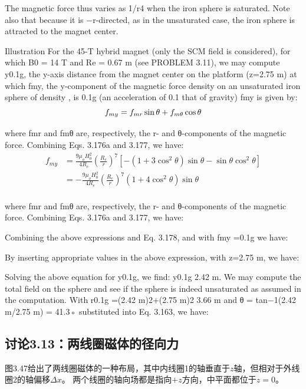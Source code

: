 The magnetic force thus varies as 1/r4 when the iron sphere is saturated. Note
also that because it is −r-directed, as in the unsaturated case, the iron sphere is
attracted to the magnet center.

Illustration For the 45-T hybrid magnet (only the SCM field is considered), for
which B0 = 14 T and Re = 0.67 m (see PROBLEM 3.11), we may compute y0.1g,
the y-axis distance from the magnet center on the platform (z=2.75 m) at which
fmy, the y-component of the magnetic force density on an unsaturated iron sphere
of density , is 0.1g (an acceleration of 0.1 that of gravity) fmy is given by:
\begin{equation}
f_{my}=f_{mr}\sin\theta+f_{m\theta}\cos\theta\\%
\end{equation}

where fmr and fmθ are, respectively, the r- and θ-components of the magnetic
force. Combining Eqs. 3.176a and 3.177, we have:
\begin{equation}
\begin{split}
f_{my}&=\frac{9\mu_{o}H_{0}^{2}}{4R_{e}}(\frac{R_{e}}{r})^{7}[-(1+3\cos^{2}\theta)\sin\theta-\sin\theta\cos^{2}\theta]\\
&=-\frac{9\mu_{o}H_{0}^{2}}{4R_{e}}(\frac{R_{e}}{r})^{7}(1+4\cos^{2}\theta)\sin\theta\\%
\end{split}
\end{equation}

where fmr and fmθ are, respectively, the r- and θ-components of the magnetic
force. Combining Eqs. 3.176a and 3.177, we have:

Combining the above expressions and Eq. 3.178, and with fmy =0.1g we have:

By inserting appropriate values in the above expression, with z=2.75 m, we have:

Solving the above equation for y0.1g, we find: y0.1g  2.42 m.
We may compute the total field on the sphere and see if the sphere is indeed unsaturated as assumed in the computation. With r0.1g =(2.42 m)2+(2.75 m)2 
3.66 m and θ = tan−1(2.42 m/2.75 m) = 41.3◦ substituted into Eq. 3.163, we have:

\newpage




\subsection{讨论3.13：两线圈磁体的径向力}
图3.47给出了两线圈磁体的一种布局，其中内线圈1的轴垂直于$z$轴，但相对于外线圈2的轴偏移$\Delta x$。
两个线圈的轴向场都是指向$+z$方向，中平面都位于$z=0$。

